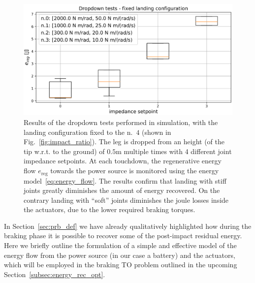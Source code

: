 \begin{figure}[t]
    \centering
    \includegraphics[width=1\columnwidth]{images/dropdown_const_landing.pdf}
    \caption{Results of the dropdown tests performed in simulation, with the landing configuration fixed to the n.~$4$ (shown in Fig.~\ref{fig:impact_ratio}). The leg is dropped from an height (of the tip w.r.t. to the ground) of $0.5\mathrm{m}$ multiple times with 4 different joint impedance setpoints. At each touchdown, the regenerative energy flow $e_{\mathrm{reg}}$ towards the power source is monitored using the energy model~\eqref{eq:energy_flow}. The results confirm that landing with stiff joints greatly diminishes the amount of energy recovered. On the contrary landing with \enquote{soft} joints diminishes the joule losses inside the actuators, due to the lower required braking torques.}
    \label{fig:fixed_conf_reg_energy}
\end{figure}

In Section~\ref{sec:prb_def} we have already qualitatively highlighted how during the braking phase it is possible to recover some of the post-impact residual energy. Here we briefly outline the formulation of a simple and effective model of the energy flow from the power source (in our case a battery) and the actuators, which will be employed in the braking TO problem outlined in the upcoming Section~\ref{subsec:energy_rec_opt}. 

